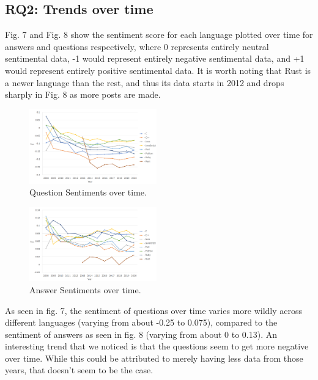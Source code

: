 \documentclass[conference]{IEEEtran}
\begin{document}
\subsection{RQ2: Trends over time}
Fig. 7 and Fig. 8 show the sentiment score for each language plotted over time for answers and questions respectively, where 0 represents entirely neutral sentimental data, -1 would represent entirely negative sentimental data, and +1 would represent entirely positive sentimental data. It is worth noting that Rust is a newer language than the rest, and thus its data starts in 2012 and drops sharply in Fig. 8 as more posts are made. \\

\begin{figure}[htbp]
\centerline{\includegraphics[width=0.49\textwidth]{figures/time_questions_em.png}}
\caption{Question Sentiments over time.}
\label{fig}
\end{figure}

\begin{figure}[htbp]
\centerline{\includegraphics[width=0.49\textwidth]{figures/time_answers_em.png}}
\caption{Answer Sentiments over time.}
\label{fig}
\end{figure}

As seen in fig. 7, the sentiment of questions over time varies more wildly across different languages (varying from about -0.25 to 0.075), compared to the sentiment of answers as seen in fig. 8 (varying from about 0 to 0.13). An interesting trend that we noticed is that the questions seem to get more negative over time. While this could be attributed to merely having less data from those years, that doesn't seem to be the case.\\
\end{document}
